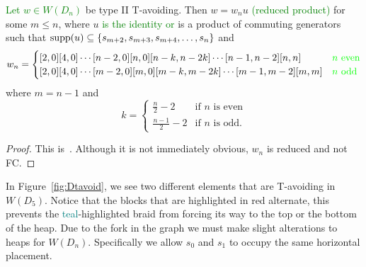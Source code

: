 \begin{proposition}
	\textcolor{green}{Let $w \in W(D_n)$} be type II T-avoiding. 
Then $w=w_nu$ \textcolor{green}{(reduced product)} for some $m \leq n$, where $u$ \textcolor{green}{is the identity or} is a product of commuting generators  such that \textcolor{green}{$\mathrm{supp}(u) \subseteq\{s_{m+2}, s_{m+3}, s_{m+4}, \ldots, s_n\}$} and 
\[ w_n=
\begin{cases}
	[2,0][4,0] \cdots [n-2,0][n,0][n-k,n-2k] \cdots [n-1,n-2][n,n]  &  \text{\textcolor{green}{ $n$ even}}\\
	[2,0][4,0] \cdots [m-2,0][m,0][m-k,m-2k] \cdots [m-1,m-2][m,m] &  \text{\textcolor{green}{$n$ odd}}
\end{cases}
\] where $m=n-1$ and 
\[
k= 
\begin{cases}
\frac{n}{2}-2 & \text{if $n$ is even}\\
\frac{n-1}{2}-2 & \text{if $n$ is odd.}
\end{cases}
\]
\begin{proof}
	This is~\cite[Lemmas 2.2.18 and 2.3.4]{Gern2013a}. Although it is not immediately obvious, $w_n$ is reduced and not FC.
\end{proof}
\end{proposition}

In Figure~\ref{fig:Dtavoid}, we see two different elements that are T-avoiding in $W(D_5)$. Notice that the blocks that are highlighted in \textcolor{rred}{red} alternate, this prevents the \textcolor{teal}{teal}-highlighted braid from forcing its way to the top or the bottom of the heap. Due to the fork in the graph we must make slight alterations to heaps for $W(D_n)$. Specifically we allow $s_0$ and $s_1$ to occupy the same horizontal placement. 

